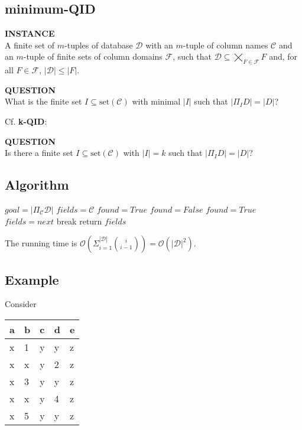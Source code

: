 \documentclass[12pt]{article}
\begin{document}

\subsection*{minimum-QID}
\textbf{INSTANCE}\\A finite set of $m$-tuples of database $\mathcal{D}$ with an $m$-tuple of column names $\mathcal{C}$ and an $m$-tuple of finite sets of column domains $\mathcal{F}$, such that $\mathcal{D} \subseteq \bigtimes_{F \in \mathcal{F}} F$ and, for all $F \in \mathcal{F}$, $|\mathcal{D}| \leq |F|$.

\noindent\textbf{QUESTION}\\What is the finite set $I \subseteq \mathrm{set}(\mathcal{C})$ with minimal $|I|$ such that $|\Pi_{I} D| = |D|$?

Cf. \textbf{k-QID}:

\noindent\textbf{QUESTION}\\Is there a finite set $I \subseteq \mathrm{set}(\mathcal{C})$ with $|I| = k$ such that $|\Pi_{I} D| = |D|$?

\subsection*{Algorithm}
\begin{algorithm}[H]
    \DontPrintSemicolon
    $goal = |\Pi_{\mathcal{C}} \mathcal{D}|$\;
    $fields = \mathcal{C}$\;
    $found = True$\;
    {
        $found = False$\;
        {
            {
                $found = True$\;
                $fields = next$\;
                break\;
            }
        }
    }
    return $fields$\;
\end{algorithm}

The running time is $\mathcal{O}(\Sigma_{i=1}^{|\mathcal{D}|} \binom{i}{i-1}) = \mathcal{O}(|\mathcal{D}|^2)$.

\subsection*{Example}
Consider
\begin{center}
    \begin{tabular}{ | M{3em} | M{3em} | M{3em} | M{3em} | M{3em} | }
    \hline
    a & b & c & d & e\\
    \hline
    x & 1 & y & y & z\\
    x & x & y & 2 & z\\
    x & 3 & y & y & z\\
    x & x & y & 4 & z\\
    x & 5 & y & y & z\\
    \hline
    \end{tabular}
\end{center}
\end{document}
